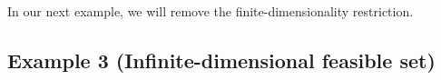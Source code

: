 \documentclass{article}
\newcommand{\Reals}%
  {\mathbb{R}}
\begin{document}

In our next example, we will remove the finite-dimensionality restriction.

\subsection{Example 3 (Infinite-dimensional feasible set)}
\end{document}

